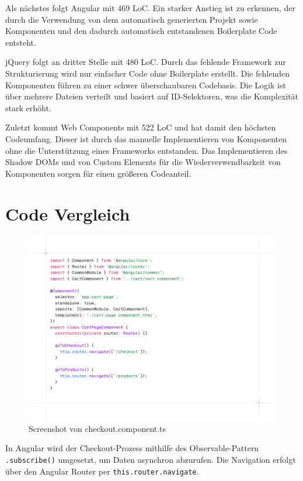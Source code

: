\documentclass[oneside]{ausarbeitung}
\begin{document}
Als nächstes folgt Angular mit 469 \ac{LoC}. Ein starker Anstieg ist zu erkennen, der durch die Verwendung von dem automatisch generierten Projekt sowie Komponenten und den dadurch automatisch entstandenen Boilerplate Code entsteht. 

jQuery folgt an dritter Stelle mit 480 LoC. Durch das fehlende Framework zur Strukturierung wird nur einfacher Code ohne Boilerplate erstellt. Die fehlenden Komponenten führen zu einer schwer überschaubaren Codebasis. Die Logik ist über mehrere Dateien verteilt und basiert auf ID-Selektoren,  was die Komplexität stark erhöht. 

Zuletzt kommt Web Components mit 522 LoC und hat damit den höchsten Codeumfang. Dieser ist durch das manuelle Implementieren von Komponenten ohne die Unterstützung eines Frameworks entstanden. Das Implementieren des Shadow DOMs und von Custom Elements für die Wiederverwendbarkeit von Komponenten sorgen für einen größeren Codeanteil. 

\section{Code Vergleich}

\begin{figure}[H]
    \centering
    \includegraphics[width=\linewidth]{images/acheckoutcomponent.png}
    \caption{Screenshot von checkout.component.ts}
    \label{fig:acheckout}
\end{figure}


In Angular wird der Checkout-Prozess mithilfe des Observable-Pattern \texttt{.subscribe()} umgesetzt, um Daten asynchron abzurufen. Die Navigation erfolgt über den Angular Router per \texttt{this.router.navigate}.
\end{document}
